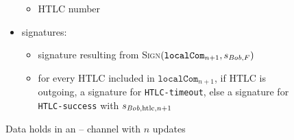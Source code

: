 \begin{figure}
\begin{mdframed}
\begin{itemize}
\begin{itemize}
          \item HTLC number
        \end{itemize}
      \item signatures:
      \begin{itemize}
        \item signature resulting from \textsc{Sign}$(\mathtt{localCom}_{n+1},
        s_{\mathit{Bob}, F})$
        \item for every HTLC included in $\mathtt{localCom}_{n+1}$, if HTLC is
        outgoing, a signature for \texttt{HTLC-timeout}, else a signature for
        \texttt{HTLC-success} with $s_{\mathit{Bob}, \mathrm{htlc}, n+1}$
      \end{itemize}
    \end{itemize}
  \end{mdframed}
  \caption{Data \alice{} holds in an \alice{} -- \bob{} channel with $n$
  updates}
  \end{figure}
